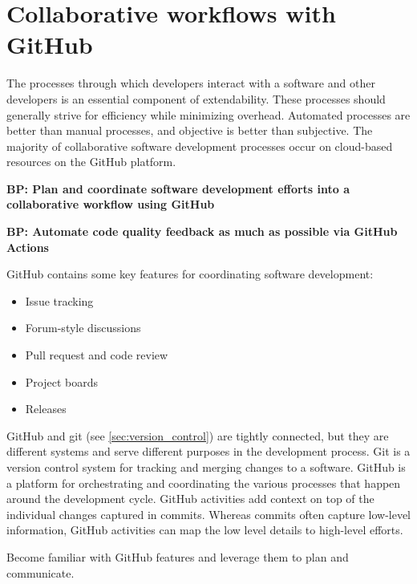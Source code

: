 \documentclass[]{nrel}
\begin{document}
\section{Collaborative workflows with GitHub}
The processes through which developers interact with a software and other developers is
an essential component of extendability.
These processes should generally strive for efficiency while minimizing overhead.
Automated processes are better than manual processes, and objective is better than subjective.
The majority of collaborative software development processes occur on cloud-based resources on
the GitHub platform.

\textbf{BP: Plan and coordinate software development efforts into a collaborative workflow using GitHub}

\textbf{BP: Automate code quality feedback as much as possible via GitHub Actions}

GitHub contains some key features for coordinating software development:
\begin{itemize}
\item Issue tracking

\item Forum-style discussions

\item Pull request and code review

\item Project boards

\item Releases

\end{itemize}

GitHub and git (see \ref{sec:version_control}) are tightly connected, but they are different
systems and serve different purposes in the development process.
Git is a version control system for tracking and merging changes to a software.
GitHub is a platform for orchestrating and coordinating the various processes that happen
around the development cycle.
GitHub activities add context on top of the individual changes captured in commits.
Whereas commits often capture low-level information, GitHub activities can map the low level
details to high-level efforts.

Become familiar with GitHub features and leverage them to plan and communicate.
\end{document}
